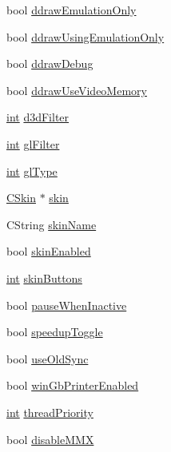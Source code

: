 \begin{DoxyCompactItemize}
\item 
bool \mbox{\hyperlink{class_v_b_a_a18c0ee1eaa744d8061ce94ce6ed870fd}{ddraw\+Emulation\+Only}}
\item 
bool \mbox{\hyperlink{class_v_b_a_a88c703304afd9e17cd80cf3e3a825f7f}{ddraw\+Using\+Emulation\+Only}}
\item 
bool \mbox{\hyperlink{class_v_b_a_a28d611a2c3dfc21191a27e8d8239de35}{ddraw\+Debug}}
\item 
bool \mbox{\hyperlink{class_v_b_a_a875d3208513412753e2e946b8d6e6ce3}{ddraw\+Use\+Video\+Memory}}
\item 
\mbox{\hyperlink{_util_8cpp_a0ef32aa8672df19503a49fab2d0c8071}{int}} \mbox{\hyperlink{class_v_b_a_a8563e53b73a28a011e656f6fc8a4e5ff}{d3d\+Filter}}
\item 
\mbox{\hyperlink{_util_8cpp_a0ef32aa8672df19503a49fab2d0c8071}{int}} \mbox{\hyperlink{class_v_b_a_a7861cd60864163f310ae87f746eba9e6}{gl\+Filter}}
\item 
\mbox{\hyperlink{_util_8cpp_a0ef32aa8672df19503a49fab2d0c8071}{int}} \mbox{\hyperlink{class_v_b_a_afb5faab6c2ddf2661b2fe19f118fd882}{gl\+Type}}
\item 
\mbox{\hyperlink{class_c_skin}{C\+Skin}} $\ast$ \mbox{\hyperlink{class_v_b_a_a2d80d3f19afa58047c05277aa0c18402}{skin}}
\item 
C\+String \mbox{\hyperlink{class_v_b_a_a61c4b5378e8a3a36cf65bf095cca7f47}{skin\+Name}}
\item 
bool \mbox{\hyperlink{class_v_b_a_a5cc7dbf58210b127d9e807e8a3262829}{skin\+Enabled}}
\item 
\mbox{\hyperlink{_util_8cpp_a0ef32aa8672df19503a49fab2d0c8071}{int}} \mbox{\hyperlink{class_v_b_a_a18dd81b37aa33a8f580a2dabe358a280}{skin\+Buttons}}
\item 
bool \mbox{\hyperlink{class_v_b_a_a77e9763291376839d4c1e5eff00604b5}{pause\+When\+Inactive}}
\item 
bool \mbox{\hyperlink{class_v_b_a_aab299545104f6df869bf8f7abee6ef0a}{speedup\+Toggle}}
\item 
bool \mbox{\hyperlink{class_v_b_a_a8a4b36a4e6259df18baf03360aacad4b}{use\+Old\+Sync}}
\item 
bool \mbox{\hyperlink{class_v_b_a_ad02c13c4fea97781a17ca6c9f9cdaa49}{win\+Gb\+Printer\+Enabled}}
\item 
\mbox{\hyperlink{_util_8cpp_a0ef32aa8672df19503a49fab2d0c8071}{int}} \mbox{\hyperlink{class_v_b_a_acde3a2cf1f42d8222850f9e8b5b28316}{thread\+Priority}}
\item 
bool \mbox{\hyperlink{class_v_b_a_ac417f46c467d0fcf095731620ca7de71}{disable\+M\+MX}}

\end{DoxyCompactItemize}
